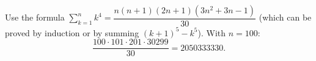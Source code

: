 Use the formula $\displaystyle\sum_{k=1}^{n}k^4=\dfrac{n(n+1)(2n+1)\left(3n^2+3n-1\right)}{30}$ (which can be proved by induction or by summing $(k+1)^5-k^5$). With $n=100$:
\[\dfrac{100\cdot101\cdot201\cdot30299}{30}=\boxed{2050333330}.\]
